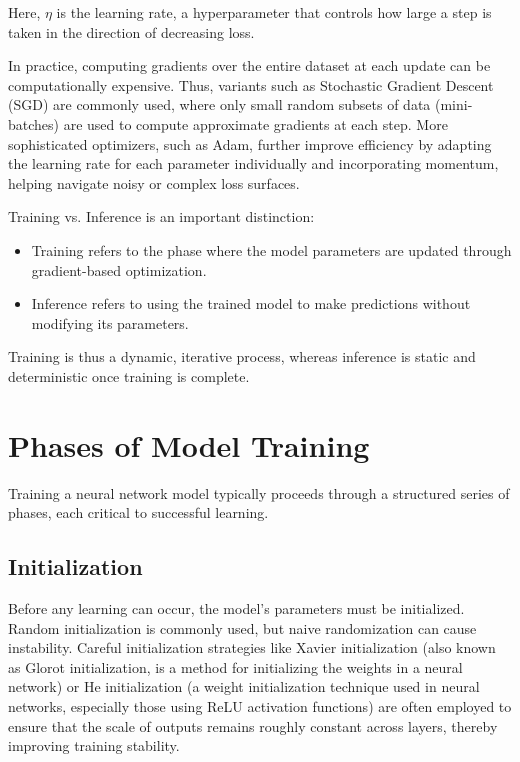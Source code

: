 \documentclass[openany]{book}
\begin{document}
Here, $\eta$ is the learning rate, a hyperparameter that controls how large a 
step is taken in the direction of decreasing loss.

In practice, computing gradients over the entire dataset at each update can be 
computationally expensive. Thus, variants such as Stochastic Gradient Descent 
(SGD) are commonly used, where only small random subsets of data (mini-batches) 
are used to compute approximate gradients at each step. More sophisticated 
optimizers, such as Adam, further improve efficiency by adapting the learning 
rate for each parameter individually and incorporating momentum, helping 
navigate noisy or complex loss surfaces.

Training vs. Inference is an important distinction:

\begin{itemize}
    \item Training refers to the phase where the model parameters are updated 
    through gradient-based optimization.
    \item Inference refers to using the trained model to make predictions 
    without modifying its parameters.
\end{itemize}

Training is thus a dynamic, iterative process, whereas inference is static and 
deterministic once training is complete.

\section{Phases of Model Training}

Training a neural network model typically proceeds through a structured series 
of phases, each critical to successful learning.

\subsection{Initialization}

Before any learning can occur, the model's parameters must be initialized. 
Random initialization is commonly used, but naive randomization can cause 
instability. Careful initialization strategies like Xavier initialization 
(also known as Glorot initialization, is a method for initializing the 
weights in a neural network) or He initialization (a weight initialization 
technique used in neural networks, especially those using ReLU activation 
functions) are often employed to ensure that the scale of outputs remains 
roughly constant across layers, thereby improving training stability.
\end{document}
